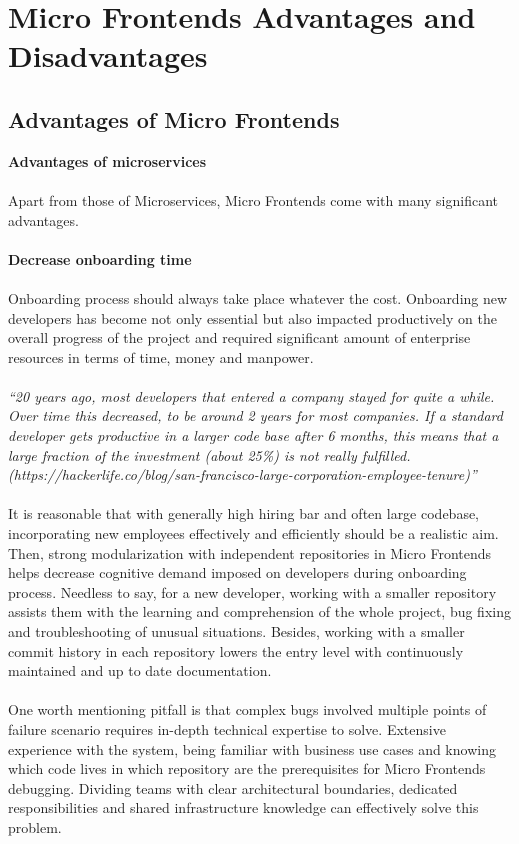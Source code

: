 \documentclass[a4paper]{book}
\begin{document}
\chapter{Micro Frontends Advantages and Disadvantages}
\section{Advantages of Micro Frontends}
\textbf{Advantages of microservices}
\\ \\ 
Apart from those of Microservices, Micro Frontends come with many significant advantages.
\\ \\ 
\textbf{Decrease onboarding time}
\\ \\ 
Onboarding process should always take place whatever the cost. Onboarding new developers has become not only essential but also impacted productively on the overall progress of the project and required significant amount of enterprise resources in terms of time, money and manpower. 
\\ 
\\
\textit{“20 years ago, most developers that entered a company stayed for quite a while. Over time this decreased, to be around 2 years for most companies. If a standard developer gets productive in a larger code base after 6 months, this means that a large fraction of the investment (about 25\%) is not really fulfilled.  (https://hackerlife.co/blog/san-francisco-large-corporation-employee-tenure)”} \cite{Rap20}
\\
\\
It is reasonable that with generally high hiring bar and often large codebase, incorporating new employees effectively and efficiently should be a realistic aim. Then, strong modularization with independent repositories in Micro Frontends helps decrease cognitive demand imposed on developers during onboarding process. Needless to say, for a new developer, working with a smaller repository assists them with the learning and comprehension of the whole project, bug fixing and troubleshooting of unusual situations. Besides, working with a smaller commit history in each repository lowers the entry level with continuously maintained and up to date documentation. 
\\
\\
One worth mentioning pitfall is that complex bugs involved multiple points of failure scenario requires in-depth technical expertise to solve. Extensive experience with the system, being familiar with business use cases and knowing which code lives in which repository are the prerequisites for Micro Frontends debugging. Dividing teams with clear architectural boundaries, dedicated responsibilities and shared infrastructure knowledge can effectively solve this problem.
\end{document}
